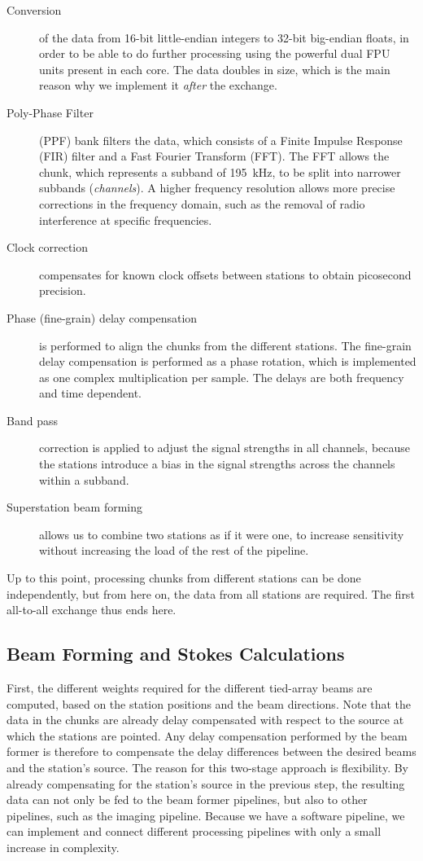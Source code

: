 \documentclass{llncs}
\begin{document}
\begin{description}
\item[Conversion] of the data from 16-bit little-endian integers to 32-bit big-endian floats, in order to be able to do further processing using the powerful dual FPU units present in each core. The data doubles in size, which is the main reason why we implement it \emph{after} the exchange.
\item[Poly-Phase Filter] (PPF) bank filters the data, which consists of a Finite Impulse Response (FIR) filter and a Fast Fourier Transform (FFT). The FFT allows the chunk, which represents a subband of 195~kHz, to be split into narrower subbands (\emph{channels}). A higher frequency resolution allows more precise corrections in the frequency domain, such as the removal of radio interference at specific frequencies.
\item[Clock correction] compensates for known clock offsets between stations to obtain picosecond precision.
\item[Phase (fine-grain) delay compensation] is performed to align the chunks from the different stations. The fine-grain delay compensation is performed as a phase rotation, which is implemented as one complex multiplication per sample. The delays are both frequency and time dependent.
\item[Band pass] correction is applied to adjust the signal strengths in all channels, because the stations introduce a bias in the signal strengths across the channels within a subband.
\item[Superstation beam forming] allows us to combine two stations as if it were one, to increase sensitivity without increasing the load of the rest of the pipeline.
\end{description}

Up to this point, processing chunks from different stations can be done independently, but from here on, the data from all stations are required. The first all-to-all exchange thus ends here.

\subsection{Beam Forming and Stokes Calculations}

First, the different weights required for the different tied-array beams are computed, based on the station positions and the beam directions. Note that the data in the chunks are already delay compensated with respect to the source at which the stations are pointed. Any delay compensation performed by the beam former is therefore to compensate the delay differences between the desired beams and the station's source. The reason for this two-stage approach is flexibility. By already compensating for the station's source in the previous step, the resulting data can not only be fed to the beam former pipelines, but also to other pipelines, such as the imaging pipeline. Because we have a software pipeline, we can implement and connect different processing pipelines with only a small increase in complexity.
\end{document}
